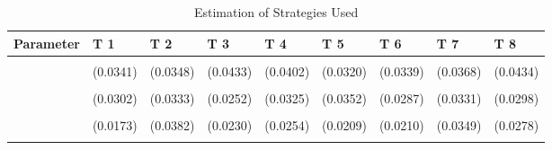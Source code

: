 \begin{table}[!h]
\centering
\caption{Estimation of Strategies Used}
\centering
\begin{tabular}[t]{lllllllll}
\toprule
Parameter & T 1 & T 2 & T 3 & T 4 & T 5 & T 6 & T 7 & T 8\\
\midrule
\cellcolor{gray!10}{gamma} & \cellcolor{gray!10}{0.8196***} & \cellcolor{gray!10}{0.7007***} & \cellcolor{gray!10}{0.7976***} & \cellcolor{gray!10}{0.8335***} & \cellcolor{gray!10}{0.7472***} & \cellcolor{gray!10}{0.8335***} & \cellcolor{gray!10}{0.7864***} & \cellcolor{gray!10}{0.8826***}\\
 & (0.0341) & (0.0348) & (0.0433) & (0.0402) & (0.0320) & (0.0339) & (0.0368) & (0.0434)\\
\cellcolor{gray!10}{AD} & \cellcolor{gray!10}{0.3933***} & \cellcolor{gray!10}{0.3107***} & \cellcolor{gray!10}{0.8008***} & \cellcolor{gray!10}{0.6458***} & \cellcolor{gray!10}{0.7213***} & \cellcolor{gray!10}{0.7088***} & \cellcolor{gray!10}{0.2955***} & \cellcolor{gray!10}{0.3154***}\\
 & (0.0302) & (0.0333) & (0.0252) & (0.0325) & (0.0352) & (0.0287) & (0.0331) & (0.0298)\\
\cellcolor{gray!10}{AC} & \cellcolor{gray!10}{0.0357*} & \cellcolor{gray!10}{0.2336***} & \cellcolor{gray!10}{0.1261***} & \cellcolor{gray!10}{0.1429***} & \cellcolor{gray!10}{0.1045***} & \cellcolor{gray!10}{0.1213***} & \cellcolor{gray!10}{0.2386***} & \cellcolor{gray!10}{0.1646***}\\
\addlinespace
 & (0.0173) & (0.0382) & (0.0230) & (0.0254) & (0.0209) & (0.0210) & (0.0349) & (0.0278)\\
\cellcolor{gray!10}{G} & \cellcolor{gray!10}{0.5710***} & \cellcolor{gray!10}{0.4557***} & \cellcolor{gray!10}{0.0730***} & \cellcolor{gray!10}{0.2113***} & \cellcolor{gray!10}{0.1742***} & \cellcolor{gray!10}{0.1699***} & \cellcolor{gray!10}{0.4660***} & \cellcolor{gray!10}{0.5200***}\\
\bottomrule
\end{tabular}
\end{table}